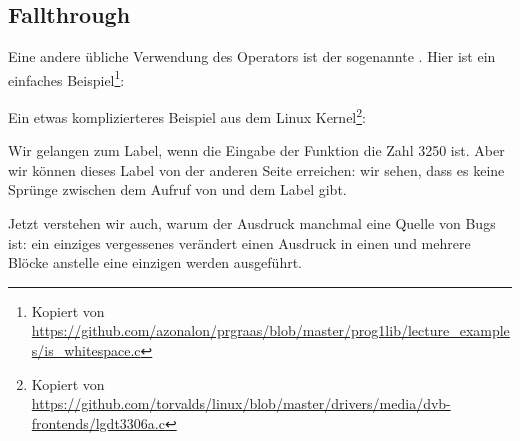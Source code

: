 \subsection{Fallthrough}
Eine andere übliche Verwendung des  Operators ist der sogenannte .
Hier ist ein einfaches Beispiel\footnote{Kopiert von
\url{https://github.com/azonalon/prgraas/blob/master/prog1lib/lecture_examples/is_whitespace.c}}:



Ein etwas komplizierteres Beispiel aus dem Linux Kernel\footnote{Kopiert von
\url{https://github.com/torvalds/linux/blob/master/drivers/media/dvb-frontends/lgdt3306a.c}}:




Wir gelangen zum  Label, wenn die Eingabe der Funktion die Zahl 3250 ist.
Aber wir können dieses Label von der anderen Seite erreichen: wir sehen, dass es keine Sprünge zwischen dem Aufruf von
\printf und dem  Label gibt.

Jetzt verstehen wir auch, warum der  Ausdruck manchmal eine Quelle von Bugs ist:
ein einziges vergessenes  verändert einen  Ausdruck in einen  und mehrere Blöcke
anstelle eine einzigen werden ausgeführt.
